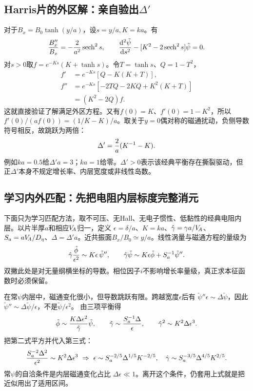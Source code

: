 \subsection{Harris片的外区解：亲自验出$\Delta'$}
对于$B_x=B_0\tanh(y/a)$，设$s=y/a,K=ka$。有
\begin{equation}
 {B_x''\over B_x}=-{2\over a^2}\operatorname{sech}^2s,\qquad
 {\mathrm d^2\tilde\psi\over\mathrm ds^2}
 -[K^2-2\operatorname{sech}^2s]\tilde\psi=0.
\end{equation}
对$s>0$取$f=e^{-Ks}(K+\tanh s)$。令$T=\tanh s$、$Q=1-T^2$，
\begin{align}
 f'&=e^{-Ks}[Q-K(K+T)],\\
 f''&=e^{-Ks}[-2TQ-2KQ+K^2(K+T)]\\
 &=(K^2-2Q)f.
\end{align}
这就直接验证了解满足外区方程。又有$f(0)=K$、$f'(0)=1-K^2$，所以
$f'(0)/(af(0))=(1/K-K)/a$。取关于$y=0$偶对称的磁通扰动，负侧导数符号相反，故跳跃为两倍：
\begin{equation}
 \Delta'={2\over a}(K^{-1}-K).
\end{equation}
例如$ka=0.5$给$\Delta'a=3$；$ka=1$给零。$\Delta'>0$表示该经典平衡存在撕裂驱动，但正$\Delta'$本身不规定增长率、内层宽度或非线性岛数。

\subsection{学习内外匹配：先把电阻内层标度完整消元}
下面只为学习匹配方法，取不可压、无Hall、无电子惯性、低黏性的经典电阻内层。以片半厚$a$和相应$V_{\!A}$归一，定义
$\epsilon=\delta/a$、$K=ka$、$\hat\gamma=\gamma a/V_{\!A}$、$S_a=aV_{\!A}/D_\eta$、$\Delta=\Delta'a$。近共振面$B_x/B_0\simeq y/a$。线性涡量与磁通方程的量级为
\begin{equation}
 \hat\gamma{\tilde\phi\over\epsilon^2}
 \sim K\epsilon\,\tilde\psi'',\qquad
 \hat\gamma\tilde\psi\sim K\epsilon\tilde\phi+S_a^{-1}\tilde\psi''.
\end{equation}
双撇此处是对无量纲横坐标的导数。相位因子$i$不影响增长率量级，真正求本征函数时必须保留。

在常$\psi$内层中，磁通变化很小，但导数跳跃有限。跨越宽度$\epsilon$后有
$\tilde\psi''\epsilon\sim\Delta\tilde\psi$，因此
$\tilde\psi''\sim\Delta\tilde\psi/\epsilon$，不是$\tilde\psi/\epsilon^2$。
由三项平衡得
\begin{equation}
 \tilde\phi\sim{K\Delta\epsilon^2\over\hat\gamma}\tilde\psi,\qquad
 \hat\gamma\sim{S_a^{-1}\Delta\over\epsilon},\qquad
 \hat\gamma^2\sim K^2\Delta\epsilon^3.
\end{equation}
把第二式平方并代入第三式：
\begin{equation}
 {S_a^{-2}\Delta^2\over\epsilon^2}
 \sim K^2\Delta\epsilon^3
 \ \Rightarrow\ 
 \epsilon\sim S_a^{-2/5}\Delta^{1/5}K^{-2/5},\quad
 \hat\gamma\sim S_a^{-3/5}\Delta^{4/5}K^{2/5}.
\end{equation}
常$\psi$的自洽条件是内层磁通变化占比
$\Delta\epsilon\ll1$。离开这个条件，仍套用上式就是把近似用出了适用区间。

